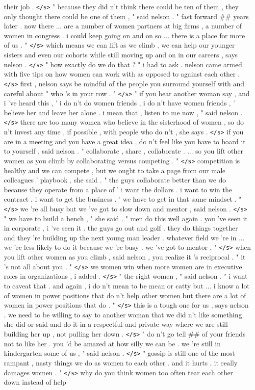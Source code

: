 \documentclass[12pt]{report}
\begin{document}
\begin{appendices}
their job . \texttt{</s>} " because they did n't think there could be ten of them , they only thought there could be one of them , " said nelson . " fast forward \#\# years later . now there ... are a number of women partners at big firms , a number of women in congress . i could keep going on and on so ... there is a place for more of us . " \texttt{</s>} which means we can lift as we climb , we can help our younger sisters and even our cohorts while still moving up and on in our careers , says nelson . \texttt{</s>} " how exactly do we do that ? " i had to ask . nelson came armed with five tips on how women can work with as opposed to against each other . \texttt{</s>} first , nelson says be mindful of the people you surround yourself with and careful about " who 's in your row . " \texttt{</s>} " if you hear another woman say , and i 've heard this , ' i do n't do women friends , i do n't have women friends , ' believe her and leave her alone . i mean that , listen to me now , " said nelson . \texttt{</s>} there are too many women who believe in the sisterhood of women , so do n't invest any time , if possible , with people who do n't , she says . \texttt{</s>} if you are in a meeting and you have a great idea , do n't feel like you have to hoard it to yourself , said nelson . " collaborate , share , collaborate . ... so you lift other women as you climb by collaborating versus competing . " \texttt{</s>} competition is healthy and we can compete , but we ought to take a page from our male colleagues ' playbook , she said . " the guys collaborate better than we do because they operate from a place of ' i want the dollars . i want to win the contract . i want to get the business . ' we have to get in that same mindset . " \texttt{</s>} we 're all busy but we 've got to slow down and mentor , said nelson . \texttt{</s>} " we have to build a bench , " she said . " men do this well again . you 've seen it in corporate , i 've seen it . the guys go out and golf . they do things together and they 're building up the next young man leader . whatever field we 're in ... we 're less likely to do it because we 're busy . we 've got to mentor . " \texttt{</s>} when you lift other women as you climb , said nelson , you realize it 's reciprocal . " it 's not all about you . " \texttt{</s>} we women win when more women are in executive roles in organizations , i added . \texttt{</s>} " the right women , " said nelson . " i want to caveat that . and again , i do n't mean to be mean or catty but ... i know a lot of women in power positions that do n't help other women but there are a lot of women in power positions that do . " \texttt{</s>} this is a tough one for us , says nelson . we need to be willing to say to another woman that we did n't like something she did or said and do it in a respectful and private way where we are still building her up , not pulling her down . \texttt{</s>} " do n't go tell \#\# of your friends not to like her . you 'd be amazed at how silly we can be . we 're still in kindergarten some of us , " said nelson . \texttt{</s>} " gossip is still one of the most rampant , nasty things we do as women to each other . and it hurts . it really damages women . " \texttt{</s>} why do you think women too often tear each other down instead of help 
\end{appendices}
\end{document}
